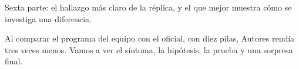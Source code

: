 Sexta parte: el hallazgo más claro de la réplica, y el que mejor muestra cómo se investiga una diferencia.

Al comparar el programa del equipo con el oficial, con diez pilas, Autores rendía tres veces menos. Vamos a ver el síntoma, la hipótesis, la prueba y una sorpresa final.
